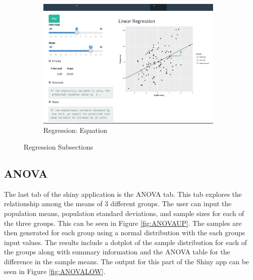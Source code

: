 \documentclass[11pt]{book}
\begin{document}
\begin{figure}
        \begin{subfigure}[b]{0.6\textwidth}
                \includegraphics[width=\textwidth]{LinEq.png}
                \caption{Regression: Equation} 
                \label{fig:LinEq}
        \end{subfigure}
        

\caption {Regression Subsections}
\end{figure}

\subsection{ANOVA}

The last tab of the shiny application is the ANOVA tab.  This tab explores the relationship among the means of 3 different groups.  The user can input the population means, population standard deviations, and sample sizes for each of the three groups. This can be seen in Figure \ref{fig:ANOVAUP}. The samples are then generated for each group using a normal distribution with the each groups input values. The results include a dotplot of the sample distribution for each of the groups along with summary information and the ANOVA table for the difference in the sample means. The output for this part of the Shiny app can be seen in Figure \ref{fig:ANOVALOW}.
\end{document}
